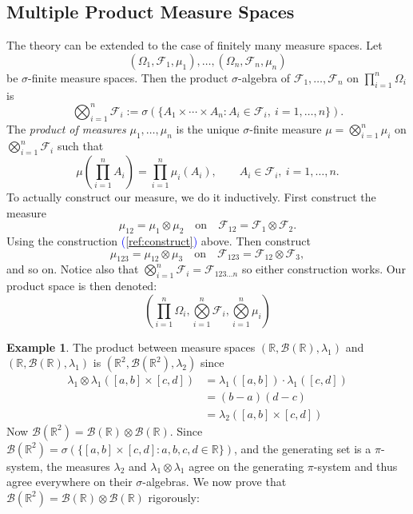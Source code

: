 \documentclass[11pt,a4paper]{article}
\theoremstyle{definition}
\newtheorem{example}{Example}[section]
\begin{document}
\subsection{Multiple Product Measure Spaces}
The theory can be extended to the case of finitely many measure spaces. Let 
\[
(\Omega_1, \mathcal{F}_1, \mu_1), \ldots, (\Omega_n, \mathcal{F}_n, \mu_n)
\]
be $\sigma$-finite measure spaces. Then the product $\sigma$-algebra of 
$\mathcal{F}_1, \ldots, \mathcal{F}_n$ on $\prod\limits _{i=1}^n \Omega_i$ is
\[
\bigotimes_{i=1}^n \mathcal{F}_i 
    := \sigma\!\left( \{ A_1 \times \cdots \times A_n : A_i \in \mathcal{F}_i,\ i=1,\ldots,n \} \right).
\]
The \emph{product of measures} $\mu_1, \ldots, \mu_n$ is the unique 
$\sigma$-finite measure $\mu = \bigotimes \limits _{i=1}^n \mu_i$ on $\bigotimes\limits _{i=1}^n \mathcal{F}_i$ such that
\[
\mu\!\left( \prod_{i=1}^n A_i \right)
    = \prod_{i=1}^n \mu_i(A_i),
    \qquad A_i \in \mathcal{F}_i,\ i = 1,\ldots,n.
\]
To actually construct our measure, we do it inductively. First construct the measure
\[
\mu_{12} = \mu_1 \otimes \mu_2 
\quad\text{on}\quad
\mathcal{F}_{12} = \mathcal{F}_1 \otimes \mathcal{F}_2.
\]
Using the construction \textcolor{blue}{(}\ref{ref:construct}\textcolor{blue}{)} above. Then construct
\[
\mu_{123} = \mu_{12} \otimes \mu_3
\quad\text{on}\quad
\mathcal{F}_{123} = \mathcal{F}_{12} \otimes \mathcal{F}_3,
\]
and so on. Notice also that $\bigotimes \limits _{i=1}^n \mathcal{F}_i = \mathcal{F}_{123...n}$ so either construction works. Our product space is then denoted:
\[
\left (\prod \limits _{i=1}^n \Omega_i, \bigotimes \limits_{i=1} ^n \mathcal{F}_i, \bigotimes \limits _{i=1}^n \mu _i \right)
\]

\begin{example} \label{ex:lebesgue}
The product between measure spaces $(\mathbb{R}, \mathcal{B}(\mathbb{R}), \lambda_1)$ and $(\mathbb{R}, \mathcal{B}(\mathbb{R}), \lambda_1)$ is $(\mathbb{R}^2, \mathcal{B}(\mathbb{R}^2), \lambda_2)$ since 
\begin{align*}
\lambda _1 \otimes \lambda_1 ([a,b] \times [c,d]) &= \lambda_1 ([a,b]) \cdot \lambda_1 ([c,d]) \\ &= (b-a) (d-c) \\ &= \lambda_2 ([a,b] \times [c,d])
\end{align*}
Now $\mathcal{B}(\mathbb{R}^2) = \mathcal{B}(\mathbb{R}) \otimes \mathcal{B}(\mathbb{R})$. Since $\mathcal{B}(\mathbb{R}^2) = \sigma(\{[a,b] \times [c,d] : a,b,c,d \in \mathbb{R}\})$, and the generating set is a $\pi$-system, the measures $\lambda _2$ and $\lambda_1 \otimes \lambda_1$ agree on the generating $\pi$-system and thus agree everywhere on their $\sigma$-algebras. We now prove that $\mathcal{B}(\mathbb{R}^2) = \mathcal{B}(\mathbb{R}) \otimes \mathcal{B}(\mathbb{R})$ rigorously:
\end{example}
\end{document}
